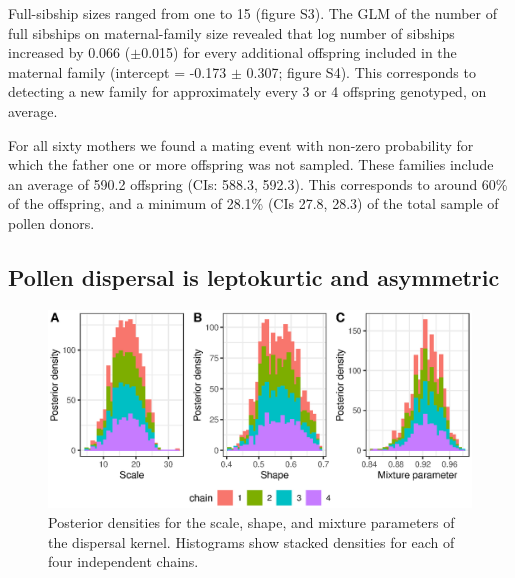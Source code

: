 \documentclass[10pt, a4paper, twocolumn]{article} %
\begin{document}
Full-sibship sizes ranged from one to 15 (figure S3).
The GLM of the number of full sibships on maternal-family size revealed that log number of sibships increased by 0.066 ($\pm$0.015) for every additional offspring included in the maternal family (intercept = -0.173 $\pm$ 0.307; figure S4). This corresponds to detecting a new family for approximately every 3 or 4 offspring genotyped, on average.

For all sixty mothers we found a mating event with non-zero probability for which the father one or more offspring was not sampled.
These families include an average of 590.2 offspring (CIs: 588.3, 592.3).
This corresponds to around 60\% of the offspring, and a minimum of 28.1\% (CIs 27.8, 28.3) of the total sample of pollen donors.

\subsection{Pollen dispersal is leptokurtic and asymmetric}

\begin{figure}
    \centering
    \includegraphics{posterior_distributions.eps}
    \caption{
        Posterior densities for the scale, shape, and mixture parameters of the dispersal kernel.
        Histograms show stacked densities for each of four independent chains.
    }
    \label{fig:posterior_summaries}
\end{figure}
\end{document}
